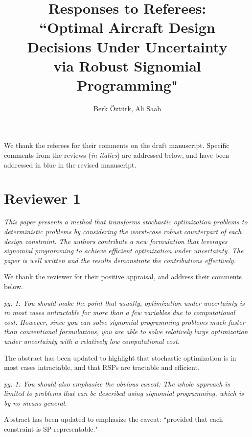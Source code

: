 \documentclass[11pt]{article}
\begin{document}
    \title{Responses to Referees: \\
    ``Optimal Aircraft Design \\ Decisions Under Uncertainty \\
    via Robust Signomial Programming"}

    \author{Berk \"Ozt\"urk, Ali Saab}

    \maketitle

    We thank the referees for their comments on the draft manuscript.
    Specific comments from the reviews (\textit{in italics}) are addressed below, and
    have been addressed {\color{blue} in blue} in the revised manuscript.

    \section{Reviewer 1}

    \textit{This paper presents a method that transforms stochastic optimization problems to
    deterministic problems by considering the worst-case robust counterpart of each design constraint.
    The authors contribute a new formulation that leverages signomial programming to achieve
    efficient optimization under uncertainty. The paper is well written and the results
    demonstrate the contributions effectively.}

    We thank the reviewer for their positive appraisal, and address their comments below.
    \bigskip

    \textit{pg. 1: You should make the point that usually, optimization under uncertainty is
    in most cases untractable for more than a few variables due to computational cost.
    However, since you can solve signomial programming problems much faster than conventional formulations,
    you are able to solve relatively large optimization under uncertainty with a relatively low computational cost.}

    The abstract has been updated to highlight that stochastic optimization is in most cases
    intractable, and that RSPs are tractable and efficient.
    \bigskip

    \textit{pg. 1: You should also emphasize the obvious caveat: The whole approach
    is limited to problems that can be described using signomial programming, which is by no means general.}

    Abstract has been updated to emphasize the caveat: ``provided that each constraint is SP-representable."
    \bigskip
\end{document}
